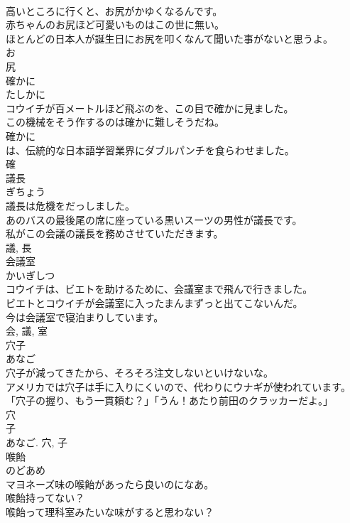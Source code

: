 \documentclass[8pt]{extreport}
\begin{document}
\begin{CJK}{UTF8}{min}
\\	高いところに行くと、お尻がかゆくなるんです。	
\\	赤ちゃんのお尻ほど可愛いものはこの世に無い。	
\\	ほとんどの日本人が誕生日にお尻を叩くなんて聞いた事がないと思うよ。	
\\	お 
\\	尻	
\\	確かに	
\\	たしかに	
\\	コウイチが百メートルほど飛ぶのを、この目で確かに見ました。	
\\	この機械をそう作するのは確かに難しそうだね。	
\\	確かに
\\	は、伝統的な日本語学習業界にダブルパンチを食らわせました。	
\\	確	
\\	議長	
\\	ぎちょう	
\\	議長は危機をだっしました。	
\\	あのバスの最後尾の席に座っている黒いスーツの男性が議長です。	
\\	私がこの会議の議長を務めさせていただきます。	
\\	議, 長	
\\	会議室	
\\	かいぎしつ	
\\	コウイチは、ビエトを助けるために、会議室まで飛んで行きました。	
\\	ビエトとコウイチが会議室に入ったまんまずっと出てこないんだ。	
\\	今は会議室で寝泊まりしています。	
\\	会, 議, 室	
\\	穴子	
\\	あなご	
\\	穴子が減ってきたから、そろそろ注文しないといけないな。	
\\	アメリカでは穴子は手に入りにくいので、代わりにウナギが使われています。	
\\	「穴子の握り、もう一貫頼む？」「うん！あたり前田のクラッカーだよ。」	
\\	穴 
\\	子 
\\	あなご.	穴, 子	
\\	喉飴	
\\	のどあめ	
\\	マヨネーズ味の喉飴があったら良いのになあ。	
\\	喉飴持ってない？	
\\	喉飴って理科室みたいな味がすると思わない？	

\end{CJK}
\end{document}
